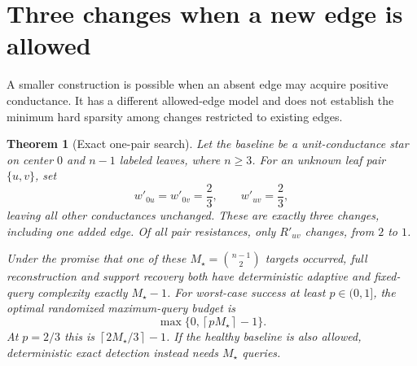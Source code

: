 \documentclass[11pt,letterpaper]{article}
\newtheorem{theorem}{Theorem}
\newcommand{\ceil}[1]{\left\lceil #1\right\rceil}
\begin{document}
\section{Three changes when a new edge is allowed}
A smaller construction is possible when an absent edge may acquire positive conductance. It has a different allowed-edge model and does not establish the minimum hard sparsity among changes restricted to existing edges.

\begin{theorem}[Exact one-pair search]\label{thm:star}
Let the baseline be a unit-conductance star on center $0$ and $n-1$ labeled leaves, where $n\ge3$. For an unknown leaf pair $\{u,v\}$, set
\[
 w'_{0u}=w'_{0v}=\frac23,\qquad w'_{uv}=\frac23,
\]
leaving all other conductances unchanged. These are exactly three changes, including one added edge. Of all pair resistances, only $R'_{uv}$ changes, from $2$ to $1$.

Under the promise that one of these $M_\star=\binom{n-1}2$ targets occurred, full reconstruction and support recovery both have deterministic adaptive and fixed-query complexity exactly $M_\star-1$. For worst-case success at least $p\in(0,1]$, the optimal randomized maximum-query budget is
\[
 \max\{0,\ceil{pM_\star}-1\}.
\]
At $p=2/3$ this is $\ceil{2M_\star/3}-1$. If the healthy baseline is also allowed, deterministic exact detection instead needs $M_\star$ queries.
\end{theorem}
\end{document}
